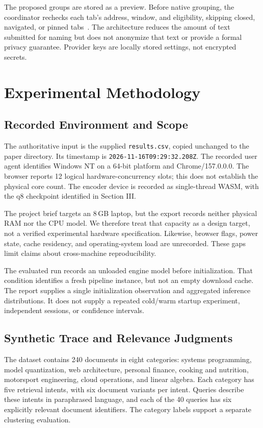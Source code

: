 \documentclass[conference]{IEEEtran}
\newcommand{\mDocuments}{240}
\newcommand{\mQueries}{40}
\newcommand{\mConcurrency}{12}
\begin{document}
The proposed groups are stored as a preview. Before native grouping, the
coordinator rechecks each tab's address, window, and eligibility, skipping
closed, navigated, or pinned tabs~\cite{chromegrouping}. The architecture reduces
the amount of text submitted for naming but does not anonymize that text or
provide a formal privacy guarantee. Provider keys are locally stored settings,
not encrypted secrets.

\section{Experimental Methodology}
\subsection{Recorded Environment and Scope}
The authoritative input is the supplied \texttt{results.csv}, copied unchanged
to the paper directory. Its timestamp is
\texttt{2026-11-16T09:29:32.208Z}. The recorded user agent identifies
Windows NT on a 64-bit platform and Chrome/157.0.0.0. The browser reports
\mConcurrency{} logical hardware-concurrency slots; this does not establish the
physical core count. The encoder device is recorded as single-thread WASM,
with the q8 checkpoint identified in Section III.

The project brief targets an 8\,GB laptop, but the export records neither
physical RAM nor the CPU model. We therefore treat that capacity as a design
target, not a verified experimental hardware specification. Likewise,
browser flags, power state, cache residency, and operating-system load are
unrecorded. These gaps limit claims about cross-machine reproducibility.

The evaluated run records an unloaded engine model before initialization.
That condition identifies a fresh pipeline instance, but not an empty
download cache. The report supplies a single initialization observation and
aggregated inference distributions. It does not supply a repeated cold/warm
startup experiment, independent sessions, or confidence intervals.

\subsection{Synthetic Trace and Relevance Judgments}
The dataset contains \mDocuments{} documents in eight categories:
systems programming, model quantization, web architecture, personal finance,
cooking and nutrition, motorsport engineering, cloud operations, and linear
algebra. Each category has five retrieval intents, with six document variants
per intent. Queries describe these intents in paraphrased language, and each
of the \mQueries{} queries has six explicitly relevant document identifiers.
The category labels support a separate clustering evaluation.
\end{document}
